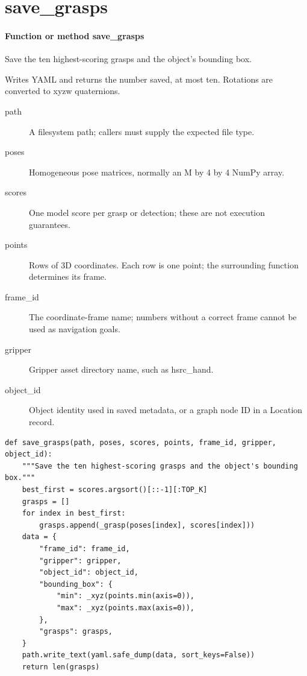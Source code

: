 \documentclass[11pt,a4paper]{book}
\begin{document}
\section{save\_grasps}

\paragraph{Function or method save\_grasps}
Save the ten highest-scoring grasps and the object's bounding box.

Writes YAML and returns the number saved, at most ten. Rotations are converted to xyzw quaternions.

\begin{description}
\item[path] A filesystem path; callers must supply the expected file type.
\item[poses] Homogeneous pose matrices, normally an M by 4 by 4 NumPy array.
\item[scores] One model score per grasp or detection; these are not execution guarantees.
\item[points] Rows of 3D coordinates. Each row is one point; the surrounding function determines its frame.
\item[frame\_id] The coordinate-frame name; numbers without a correct frame cannot be used as navigation goals.
\item[gripper] Gripper asset directory name, such as hsrc\_hand.
\item[object\_id] Object identity used in saved metadata, or a graph node ID in a Location record.
\end{description}

\begin{lstlisting}[firstnumber=30]
def save_grasps(path, poses, scores, points, frame_id, gripper, object_id):
    """Save the ten highest-scoring grasps and the object's bounding box."""
    best_first = scores.argsort()[::-1][:TOP_K]
    grasps = []
    for index in best_first:
        grasps.append(_grasp(poses[index], scores[index]))
    data = {
        "frame_id": frame_id,
        "gripper": gripper,
        "object_id": object_id,
        "bounding_box": {
            "min": _xyz(points.min(axis=0)),
            "max": _xyz(points.max(axis=0)),
        },
        "grasps": grasps,
    }
    path.write_text(yaml.safe_dump(data, sort_keys=False))
    return len(grasps)


\end{lstlisting}
\end{document}

